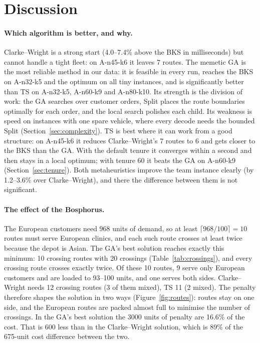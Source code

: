 \documentclass[11pt,a4paper]{article}
\theoremstyle{definition}
\theoremstyle{remark}
\begin{document}
\section{Discussion}\label{sec:discussion}

\paragraph{Which algorithm is better, and why.} Clarke--Wright is a strong start (4.0--7.4\%
above the BKS in milliseconds) but cannot handle a tight fleet: on A-n45-k6 it leaves 7
routes. The memetic GA is the most reliable method in our data: it is feasible in every
run, reaches the BKS on A-n32-k5 and the optimum on all tiny instances, and is
significantly better than TS on A-n32-k5, A-n60-k9 and A-n80-k10. Its strength is the
division of work: the GA searches over customer orders, Split places the route boundaries
optimally for each order, and the local search polishes each child. Its weakness is speed
on instances with one spare vehicle, where every decode needs the bounded Split
(Section~\ref{sec:complexity}). TS is best where it can work from a good structure: on
A-n45-k6 it reduces Clarke--Wright's 7 routes to 6 and gets closer to the BKS than the GA.
With the default tenure it converges within a second and then stays in a local optimum;
with tenure 60 it beats the GA on A-n60-k9 (Section~\ref{sec:tenure}). Both
metaheuristics improve the team instance clearly (by 1.2--3.6\% over Clarke--Wright), and
there the difference between them is not significant.

\paragraph{The effect of the Bosphorus.} The European customers need
$968$ units of demand, so at least $\lceil 968/100\rceil=10$ routes must serve
European clinics, and each such route crosses at least twice because the depot is
Asian. The GA's best solution reaches exactly this minimum: 10 crossing routes with 20
crossings (Table~\ref{tab:crossings}), and every crossing route crosses exactly twice. Of
these 10 routes, 9 serve only European customers and are loaded to 93--100 units, and one
serves both sides. Clarke--Wright needs 12 crossing routes (3 of them mixed), TS 11 (2
mixed). The penalty therefore shapes the solution in two ways
(Figure~\ref{fig:routes}): routes stay on one side, and the European routes are packed
almost full to minimise the number of crossings. In the GA's best solution the 3000 units
of penalty are 16.6\% of the cost. That is 600 less than in the Clarke--Wright solution,
which is 89\% of the 675-unit cost difference between the two.
\end{document}
